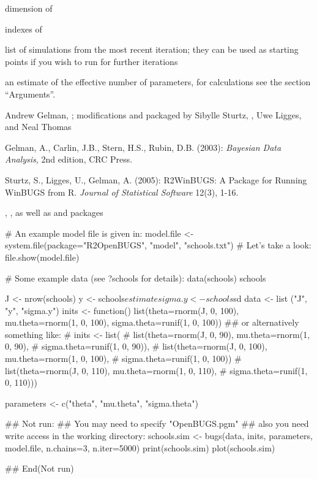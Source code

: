 \begin{Value}
\begin{ldescription}
\item[\code{dimension.short}] dimension of 
\item[\code{indexes.short}] indexes of 
\item[\code{last.values}] list of simulations from the most recent
iteration; they can be used as starting points if you wish to run
 for further iterations
\item[\code{pD}] an estimate of the effective number of parameters, for
calculations see the section ``Arguments''.
\item[\code{DIC}] 
\end{ldescription}
\end{Value}
%
\begin{Author}\relax
Andrew Gelman, ; modifications and
packaged by Sibylle Sturtz, ,
Uwe Ligges, and Neal Thomas
\end{Author}
%
\begin{References}\relax
Gelman, A., Carlin, J.B., Stern, H.S., Rubin, D.B. (2003):
\emph{Bayesian Data Analysis}, 2nd edition, CRC Press.

Sturtz, S., Ligges, U., Gelman, A. (2005):
R2WinBUGS: A Package for Running WinBUGS from R.
\emph{Journal of Statistical Software} 12(3), 1-16.
\end{References}
%
\begin{SeeAlso}\relax
{}, , as well as
 and  packages
\end{SeeAlso}
%
\begin{Examples}
\begin{ExampleCode}
# An example model file is given in:
model.file <- system.file(package="R2OpenBUGS", "model", "schools.txt")
# Let's take a look:
file.show(model.file)

# Some example data (see ?schools for details):
data(schools)
schools

J <- nrow(schools)
y <- schools$estimate
sigma.y <- schools$sd
data <- list ("J", "y", "sigma.y")
inits <- function(){
    list(theta=rnorm(J, 0, 100), mu.theta=rnorm(1, 0, 100),
         sigma.theta=runif(1, 0, 100))
}
## or alternatively something like:
# inits <- list(
#   list(theta=rnorm(J, 0, 90), mu.theta=rnorm(1, 0, 90),
#        sigma.theta=runif(1, 0, 90)),
#   list(theta=rnorm(J, 0, 100), mu.theta=rnorm(1, 0, 100),
#        sigma.theta=runif(1, 0, 100))
#   list(theta=rnorm(J, 0, 110), mu.theta=rnorm(1, 0, 110),
#        sigma.theta=runif(1, 0, 110)))

parameters <- c("theta", "mu.theta", "sigma.theta")

## Not run:
## You may need to specify "OpenBUGS.pgm"
## also you need write access in the working directory:
schools.sim <- bugs(data, inits, parameters, model.file,
    n.chains=3, n.iter=5000)
print(schools.sim)
plot(schools.sim)

## End(Not run)
\end{ExampleCode}
\end{Examples}
